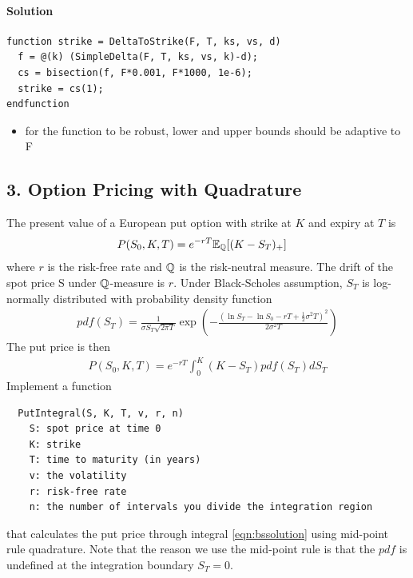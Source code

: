 \documentclass[12pt,a4paper,hidelinks,fleqn]{article}            %
\begin{document}
\paragraph{Solution}
\begin{verbatim}
function strike = DeltaToStrike(F, T, ks, vs, d)
  f = @(k) (SimpleDelta(F, T, ks, vs, k)-d);
  cs = bisection(f, F*0.001, F*1000, 1e-6);
  strike = cs(1);
endfunction
\end{verbatim}

\begin{itemize}
\item for the function to be robust, lower and upper bounds should be adaptive to F
\end{itemize}

\subsection*{3. Option Pricing with Quadrature}
The present value of a European put option with strike at $K$ and expiry at $T$ is
\begin{align*}
P(S_0, K, T) & = e^{-rT}\mathbb{E}_{\mathbb{Q}} [(K - S_T)_+]
\end{align*}
where $r$ is the risk-free rate and $\mathbb{Q}$ is the risk-neutral measure.
The drift of the spot price S under $\mathbb{Q}$-measure is $r$.
Under Black-Scholes assumption, $S_T$ is log-normally distributed with probability density function
\begin{align*}
pdf(S_T) = \frac{1}{\sigma S_T\sqrt{2\pi T}} \exp\left(- \frac{(\ln S_T - \ln S_0 - rT + \frac{1}{2}\sigma^2T)^2}{ 2\sigma^2 T} \right)
\end{align*}
The put price is then
\begin{align}
\label{eqn:bssolution}
  P(S_0, K, T) = e^{-rT}\int_0^K \left(K - S_T\right) pdf(S_T) dS_T 
\end{align}
Implement a function
\vspace{-6mm}
\begin{verbatim}
  PutIntegral(S, K, T, v, r, n)
    S: spot price at time 0
    K: strike
    T: time to maturity (in years)
    v: the volatility
    r: risk-free rate
    n: the number of intervals you divide the integration region 
\end{verbatim}
\vspace{-6mm}
that calculates the put price through integral \eqref{eqn:bssolution} using mid-point rule quadrature.
Note that the reason we use the mid-point rule is that the $pdf$ is undefined at the integration boundary $S_T=0$.
\end{document}
